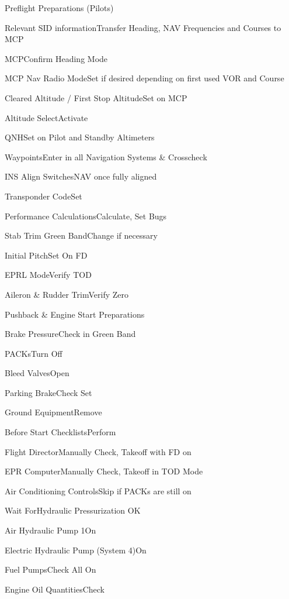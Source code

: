 \documentclass[sim-use, blue_items]{checklist}
\begin{document}
\begin{checklist}{Preflight Preparations (Pilots)}
	\item{Relevant SID information}{Transfer Heading, NAV Frequencies and Courses to MCP}
	\item{MCP}{Confirm Heading Mode}
\end{checklist}

\begin{continuedchecklist}
	\item{MCP Nav Radio Mode}{Set if desired depending on first used VOR and Course}
	\item{Cleared Altitude / First Stop Altitude}{Set on MCP}
	\item{Altitude Select}{Activate}
	\item{QNH}{Set on Pilot and Standby Altimeters}
	\item{Waypoints}{Enter in all Navigation Systems \& Crosscheck}
	\item{INS Align Switches}{NAV once fully aligned}
	\item{Transponder Code}{Set}
	\item{Performance Calculations}{Calculate, Set Bugs}
	\item{Stab Trim Green Band}{Change if necessary}
	\item{Initial Pitch}{Set On FD}
	\item{EPRL Mode}{Verify TOD}
	\item{Aileron \& Rudder Trim}{Verify Zero}
\end{continuedchecklist}

\begin{checklist}{Pushback \& Engine Start Preparations}
	\item{Brake Pressure}{Check in Green Band}
	\item{PACKs}{Turn Off}
	\item{Bleed Valves}{Open}
	\item{Parking Brake}{Check Set}
	\item{Ground Equipment}{Remove}
	\item{Before Start Checklists}{Perform}
	 {
		\item{Flight Director}{Manually Check, Takeoff with FD on}
		\item{EPR Computer}{Manually Check, Takeoff in TOD Mode}
		\item{Air Conditioning Controls}{Skip if PACKs are still on}
	}
	 {
		\item{Wait For}{Hydraulic Pressurization OK}
		\item{Air Hydraulic Pump 1}{On}
		\item{Electric Hydraulic Pump (System 4)}{On}
	}
	\item{Fuel Pumps}{Check All On}
	\item{Engine Oil Quantities}{Check}
\end{checklist}
\end{document}
